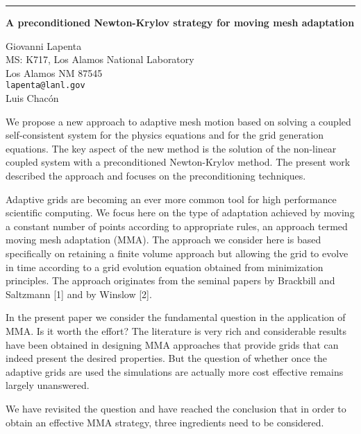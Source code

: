 \documentclass[twosided]{report}
\begin{document}
	\begin{center} \rule{6in}{1pt} \end{center}

\begin{center}
{\large			%
{\bf A preconditioned Newton-Krylov strategy for moving mesh adaptation}}

	Giovanni Lapenta \\
	MS: K717, Los Alamos National Laboratory \\
	Los Alamos NM 87545 \\
	{\tt lapenta@lanl.gov} \\
	Luis Chac\'on
\end{center}
We propose a new approach to adaptive mesh motion based on
solving a coupled self-consistent system for the physics
equations and for the grid generation equations. The key
aspect of the new method is the solution of the non-linear
coupled system with a preconditioned Newton-Krylov method.
The present work described the approach and focuses on the
preconditioning techniques.

Adaptive grids are becoming
an ever more common tool for high performance scientific
computing. We focus here on the type of adaptation achieved
by moving a constant number of points according to
appropriate rules, an approach termed moving mesh adaptation
(MMA). The approach we consider here is based specifically
on retaining a finite volume approach but allowing the grid
to evolve in time according to a grid evolution equation
obtained from minimization principles. The approach
originates from the seminal papers by Brackbill and
Saltzmann [1] and by Winslow [2].

In the present paper we
consider the fundamental question in the application of MMA.
Is it worth the effort? The literature is very rich and
considerable results have been obtained in designing MMA
approaches that provide grids that can indeed present the
desired properties. But the question of whether once the
adaptive grids are used the simulations are actually more
cost effective remains largely unanswered.

We have
revisited the question and have reached the conclusion that
in order to obtain an effective MMA strategy, three
ingredients need to be considered.
\end{document}
